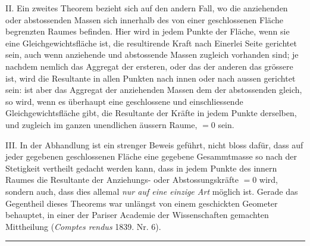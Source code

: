 II. Ein zweites Theorem bezieht sich auf den andern Fall, wo die anziehenden
oder abstossenden Massen sich innerhalb des von einer geschlossenen
Fläche begrenzten Raumes befinden. Hier wird in jedem Punkte der Fläche,
wenn sie eine Gleichgewichtsfläche ist, die resultirende Kraft nach Einerlei Seite
gerichtet sein, auch wenn anziehende und abstossende Massen zugleich vorhanden
sind; je nachdem nemlich das Aggregat der ersteren, oder das der anderen das
grössere ist, wird die Resultante in allen Punkten nach innen oder nach aussen
gerichtet sein: ist aber das Aggregat der anziehenden Massen dem der abstossenden
gleich, so wird, wenn es überhaupt eine geschlossene und einschliessende
Gleichgewichtsfläche gibt, die Resultante der Kräfte in jedem Punkte derselben,
und zugleich im ganzen unendlichen äussern Raume, \(=0\) sein.

III. In der Abhandlung ist ein strenger Beweis geführt, nicht bloss dafür,
dass auf jeder gegebenen geschlossenen Fläche eine gegebene Gesammtmasse so
nach der Stetigkeit vertheilt gedacht werden kann, dass in jedem
\clearpage
{}
\noindent
Punkte des innern Raumes die Resultante der Anziehungs- oder Abstossungskräfte
\(=0\) wird, sondern auch, dass dies allemal \textit{nur auf eine einzige Art} möglich ist.
Gerade das Gegentheil dieses Theorems war unlängst von einem geschickten
Geometer behauptet, in einer der Pariser Academie der Wissenschaften gemachten
Mittheilung (\textit{Comptes rendus} 1839. Nr. 6).
\begin{center}\rule{.26\linewidth}{.4pt}\end{center}
